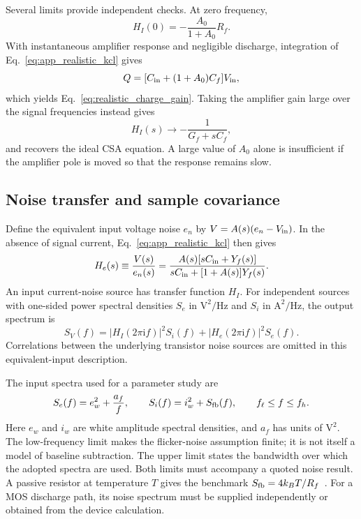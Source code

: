 Several limits provide independent checks. At zero frequency,
\begin{equation}
 H_I(0)=-\frac{A_0}{1+A_0}R_f.
\end{equation}
With instantaneous amplifier response and negligible discharge, integration of Eq.~\eqref{eq:app_realistic_kcl} gives
\begin{equation}
 Q=[C_{\rm in}+(1+A_0)C_f]V_{\rm in},
\end{equation}
which yields Eq.~\eqref{eq:realistic_charge_gain}. Taking the amplifier gain large over the signal frequencies instead gives
\begin{equation}
 H_I(s)\longrightarrow-\frac{1}{G_f+sC_f},
\end{equation}
and recovers the ideal CSA equation. A large value of $A_0$ alone is insufficient if the amplifier pole is moved so that the response remains slow.

\subsection{Noise transfer and sample covariance}
\label{app:realistic_noise}

Define the equivalent input voltage noise $e_n$ by $V=A(s)(e_n-V_{\rm in})$. In the absence of signal current, Eq.~\eqref{eq:app_realistic_kcl} then gives
\begin{equation}
 H_e(s)\equiv\frac{V(s)}{e_n(s)}
 =\frac{A(s)[sC_{\rm in}+Y_f(s)]}
 {sC_{\rm in}+[1+A(s)]Y_f(s)}.
 \label{eq:app_realistic_noise_gain}
\end{equation}
An input current-noise source has transfer function $H_I$. For independent sources with one-sided power spectral densities $S_e$ in $\mathrm{V^2/Hz}$ and $S_i$ in $\mathrm{A^2/Hz}$, the output spectrum is
\begin{equation}
 S_V(f)=|H_I(2\pi\mathrm{i}f)|^2S_i(f)
       +|H_e(2\pi\mathrm{i}f)|^2S_e(f).
 \label{eq:app_realistic_output_noise}
\end{equation}
Correlations between the underlying transistor noise sources are omitted in this equivalent-input description.

The input spectra used for a parameter study are
\begin{equation}
 S_e(f)=e_w^2+\frac{a_f}{f},\qquad
 S_i(f)=i_w^2+S_{\rm fb}(f),\qquad f_{\ell}\leq f\leq f_h.
 \label{eq:app_realistic_input_noise}
\end{equation}
Here $e_w$ and $i_w$ are white amplitude spectral densities, and $a_f$ has units of $\mathrm{V^2}$. The low-frequency limit makes the flicker-noise assumption finite; it is not itself a model of baseline subtraction. The upper limit states the bandwidth over which the adopted spectra are used. Both limits must accompany a quoted noise result. A passive resistor at temperature $T$ gives the benchmark $S_{\rm fb}=4k_BT/R_f$~\cite{tiNoise2007}. For a MOS discharge path, its noise spectrum must be supplied independently or obtained from the device calculation.

